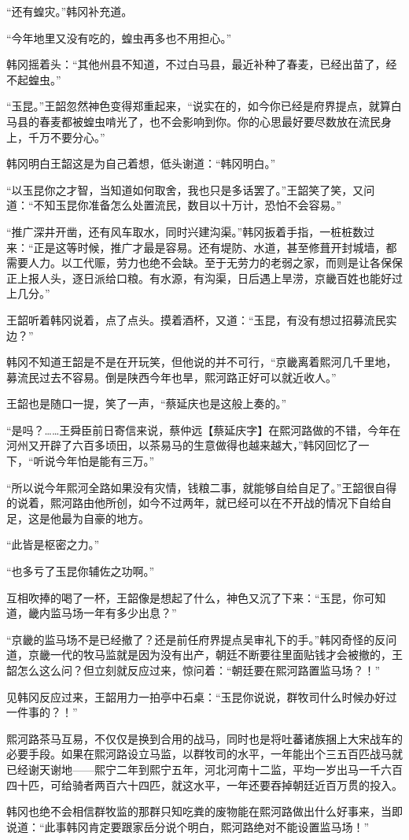 “还有蝗灾。”韩冈补充道。

“今年地里又没有吃的，蝗虫再多也不用担心。”

韩冈摇着头：“其他州县不知道，不过白马县，最近补种了春麦，已经出苗了，经不起蝗虫。”

“玉昆。”王韶忽然神色变得郑重起来，“说实在的，如今你已经是府界提点，就算白马县的春麦都被蝗虫啃光了，也不会影响到你。你的心思最好要尽数放在流民身上，千万不要分心。”

韩冈明白王韶这是为自己着想，低头谢道：“韩冈明白。”

“以玉昆你之才智，当知道如何取舍，我也只是多话罢了。”王韶笑了笑，又问道：“不知玉昆你准备怎么处置流民，数目以十万计，恐怕不会容易。”

“推广深井开凿，还有风车取水，同时兴建沟渠。”韩冈扳着手指，一桩桩数过来：“正是这等时候，推广才最是容易。还有堤防、水道，甚至修葺开封城墙，都需要人力。以工代赈，劳力也绝不会缺。至于无劳力的老弱之家，而则是让各保保正上报人头，逐日派给口粮。有水源，有沟渠，日后遇上旱涝，京畿百姓也能好过上几分。”

王韶听着韩冈说着，点了点头。摸着酒杯，又道：“玉昆，有没有想过招募流民实边？”

韩冈不知道王韶是不是在开玩笑，但他说的并不可行，“京畿离着熙河几千里地，募流民过去不容易。倒是陕西今年也旱，熙河路正好可以就近收人。”

王韶也是随口一提，笑了一声，“蔡延庆也是这般上奏的。”

“是吗？……王舜臣前日寄信来说，蔡仲远【蔡延庆字】在熙河路做的不错，今年在河州又开辟了六百多顷田，以茶易马的生意做得也越来越大，”韩冈回忆了一下，“听说今年怕是能有三万。”

“所以说今年熙河全路如果没有灾情，钱粮二事，就能够自给自足了。”王韶很自得的说着，熙河路由他所创，如今不过两年，就已经可以在不开战的情况下自给自足，这是他最为自豪的地方。

“此皆是枢密之力。”

“也多亏了玉昆你辅佐之功啊。”

互相吹捧的喝了一杯，王韶像是想起了什么，神色又沉了下来：“玉昆，你可知道，畿内监马场一年有多少出息？”

“京畿的监马场不是已经撤了？还是前任府界提点吴审礼下的手。”韩冈奇怪的反问道，京畿一代的牧马监就是因为没有出产，朝廷不断要往里面贴钱才会被撤的，王韶怎么这么问？但立刻就反应过来，惊问着：“朝廷要在熙河路置监马场？！”

见韩冈反应过来，王韶用力一拍亭中石桌：“玉昆你说说，群牧司什么时候办好过一件事的？！”

熙河路茶马互易，不仅仅是换到合用的战马，同时也是将吐蕃诸族捆上大宋战车的必要手段。如果在熙河路设立马监，以群牧司的水平，一年能出个三五百匹战马就已经谢天谢地——熙宁二年到熙宁五年，河北河南十二监，平均一岁出马一千六百四十匹，可给骑者两百六十四匹，就这水平，一年还要吞掉朝廷近百万贯的投入。

韩冈也绝不会相信群牧监的那群只知吃粪的废物能在熙河路做出什么好事来，当即说道：“此事韩冈肯定要跟家岳分说个明白，熙河路绝对不能设置监马场！”

